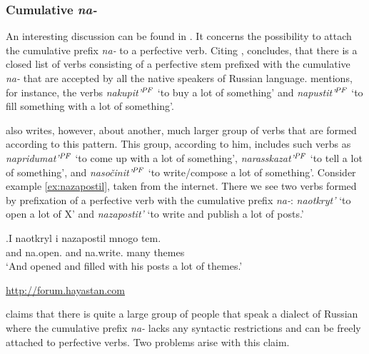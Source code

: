 \subsubsection{Cumulative \textit{na-}}
An interesting discussion can be found in \citet{Tatevosov:13a}. It concerns the possibility to attach the cumulative prefix \textit{na-} to a perfective verb. Citing \citet{Zaliznjak:03}, \citet{Tatevosov:13a} concludes, that there is a closed list of verbs consisting of a perfective stem prefixed with the cumulative \textit{na-} that are accepted by all the native speakers of Russian language. \citet{Tatevosov:13a} mentions, for instance, the verbs \textit{nakupit'}$^{\mathit{PF}}$ `to buy a lot of something' and \textit{napustit'}$^{\mathit{PF}}$ `to fill something with a lot of something'. 

\citeauthor{Tatevosov:13a} also writes, however, about another, much larger group of verbs that are formed according to this pattern. This group, according to him, includes such verbs as \textit{napridumat'}$^{\mathit{PF}}$ `to come up with a lot of something', \textit{narasskazat'}$^{\mathit{PF}}$ `to tell a lot of something', and \textit{naso\v{c}init'}$^{\mathit{PF}}$ `to write/compose a lot of something'. Consider example \ref{ex:nazapostil}, taken from the internet. There we see two verbs formed by prefixation of a perfective verb with the cumulative prefix \textit{na-}: \textit{naotkryt'} `to open a lot of X' and \textit{nazapostit'} `to write and publish a lot of posts.'
 
\exg.\label{ex:nazapostil}I naotkryl i nazapostil mnogo tem.\\
and na.open. and {na.write.} {many} {themes}\\
\vspace{0.5em}
`And opened and filled with his posts a lot of themes.'
\begin{flushright}
\vspace{-1em}
\url{http://forum.hayastan.com}
\end{flushright} 

\citet{Tatevosov:13a} claims that there is quite a large group of people that speak a dialect of Russian where the cumulative prefix \textit{na-} lacks any syntactic restrictions and can be freely attached to perfective verbs. Two problems arise with this claim.

